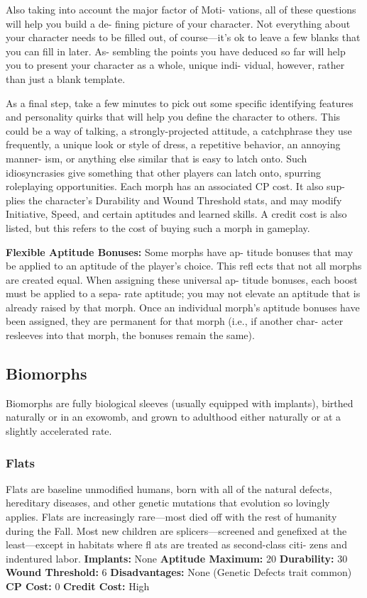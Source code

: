 Also taking into account the major factor of Moti-
vations, all of these questions will help you build a de-
fining picture of your character. Not everything about 
your character needs to be filled out, of course—it's 
ok to leave a few blanks that you can fill in later. As-
sembling the points you have deduced so far will help 
you to present your character as a whole, unique indi-
vidual, however, rather than just a blank template.

As a final step, take a few minutes to pick out some 
specific identifying features and personality quirks that 
will help you define the character to others. This could 
be a way of talking, a strongly-projected attitude, a 
catchphrase they use frequently, a unique look or style 
of dress, a repetitive behavior, an annoying manner-
ism, or anything else similar that is easy to latch onto. 
Such idiosyncrasies give something that other players 
can latch onto, spurring roleplaying opportunities.
Each morph has an associated CP cost. It also sup-
plies the character's Durability and Wound Threshold 
stats, and may modify Initiative, Speed, and certain 
aptitudes and learned skills. A credit cost is also listed, 
but this refers to the cost of buying such a morph in 
gameplay.

\textbf{Flexible Aptitude Bonuses:} Some morphs have ap-
titude bonuses that may be applied to an aptitude of 
the player's choice. This refl ects that not all morphs 
are created equal. When assigning these universal ap-
titude bonuses, each boost must be applied to a sepa-
rate aptitude; you may not elevate an aptitude that 
is already raised by that morph. Once an individual 
morph's aptitude bonuses have been assigned, they 
are permanent for that morph (i.e., if another char-
acter resleeves into that morph, the bonuses remain 
the same).

\subsection{Biomorphs}

Biomorphs are fully biological sleeves (usually 
equipped with implants), birthed naturally or in an 
exowomb, and grown to adulthood either naturally 
or at a slightly accelerated rate.

\subsubsection{Flats}

Flats are baseline unmodified humans, born with all 
of the natural defects, hereditary diseases, and other 
genetic mutations that evolution so lovingly applies. 
Flats are increasingly rare—most died off with the rest 
of humanity during the Fall. Most new children are 
splicers—screened and genefixed at the least—except 
in habitats where fl ats are treated as second-class citi-
zens and indentured labor.
\textbf{Implants: }None
\textbf{Aptitude Maximum: }20
\textbf{Durability:} 30
\textbf{Wound Threshold:} 6
\textbf{Disadvantages: }None (Genetic Defects trait common)
\textbf{CP Cost: }0
\textbf{Credit Cost: }High

